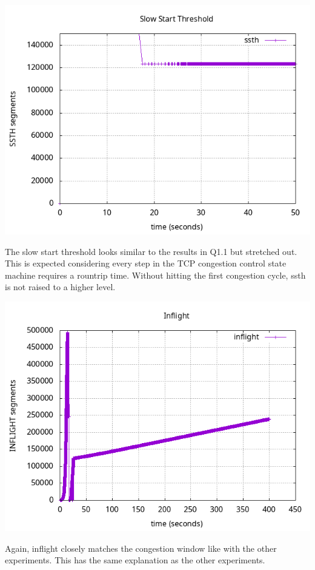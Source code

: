 \documentclass{article}
\begin{document}
\includegraphics[scale=0.5]{plots/lab1-group5-task1-experimentC-question1.1-xrange-0-50-yrange-0-150000.png}

The slow start threshold looks similar to the results in Q1.1 but stretched out. This is expected considering every step in the TCP congestion control state machine requires a rountrip time. Without hitting the first congestion cycle, ssth is not raised to a higher level.

\includegraphics[scale=0.5]{plots/lab1-group5-task1-experimentC-question1.2.png}

Again, inflight closely matches the congestion window like with the other experiments. This has the same explanation as the other experiments.
\end{document}
